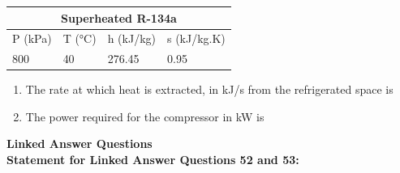 \documentclass[journal,11pt,onecolumn]{IEEEtran}
\begin{document}
\begin{table}[H]
    \centering
    \begin{tabular}{|l|l|l|l|}
        \hline
        \multicolumn{4}{|c|}{\textbf{Superheated R-134a}} \\
        \hline
        P (kPa) & T (°C) & h (kJ/kg) & s (kJ/kg.K)        \\
        \hline
        800     & 40     & 276.45    & 0.95               \\
        \hline
    \end{tabular}
\end{table}

\begin{enumerate}[resume]

    \item The rate at which heat is extracted, in kJ/s from the refrigerated space is

          \begin{enumerate}
          \end{enumerate}

    \item The power required for the compressor in kW is

          \begin{enumerate}
          \end{enumerate}

\end{enumerate}

\newpage

\large\textbf{Linked Answer Questions}\\

\normalsize\textbf{Statement for Linked Answer Questions 52 and 53:}
\end{document}
